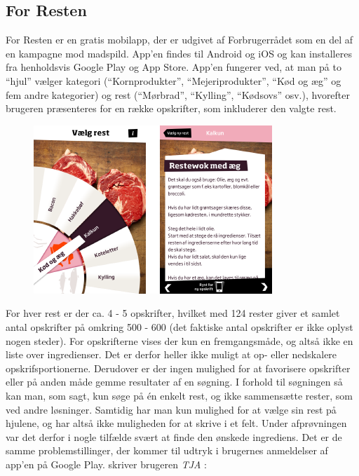 \subsection{For Resten}
For Resten er en gratis mobilapp, der er udgivet af Forbrugerrådet som en del af en kampagne mod madspild. App’en findes til Android og iOS og kan installeres fra henholdsvis Google Play og App Store. App’en fungerer ved, at man på to ``hjul'' vælger kategori (``Kornprodukter'', ``Mejeriprodukter'', ``Kød og æg'' og fem andre kategorier) og rest (\fx ``Mørbrad'', ``Kylling'', ``Kødsovs'' osv.), hvorefter brugeren præsenteres for en række opskrifter, som inkluderer den valgte rest.

\begin{figure}[H]
\centering
\includegraphics[scale=0.7]{billeder/forbilleder/forresten.png}
\label{fig:forresten}
\end{figure}

For hver rest er der ca. 4 - 5 opskrifter, hvilket med 124 rester giver et samlet antal opskrifter på omkring 500 - 600 (det faktiske antal opskrifter er ikke oplyst nogen steder). For opskrifterne vises der kun en fremgangsmåde, og altså ikke en liste over ingredienser. Det er derfor heller ikke muligt at op- eller nedskalere opskrifsportionerne. Derudover er der ingen mulighed for at favorisere opskrifter eller på anden måde gemme resultater af en søgning. I forhold til søgningen så kan man, som sagt, kun søge på én enkelt rest, og ikke sammensætte rester, som ved andre løsninger. Samtidig har man kun mulighed for at vælge sin rest på hjulene, og har altså ikke muligheden for at skrive i et felt. Under afprøvningen var det derfor i nogle tilfælde svært at finde den ønskede ingrediens. Det er de samme problemstillinger, der kommer til udtryk i brugernes anmeldelser af app’en på Google Play. \Fx skriver brugeren \textit{TJA} \cite{tja}:

